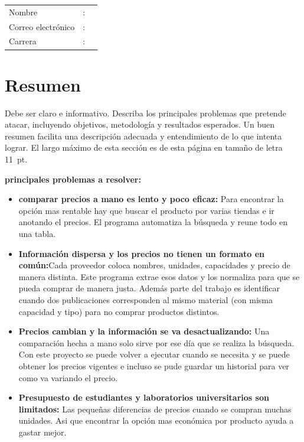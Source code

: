\documentclass[11pt,spanish]{article}
\begin{document}
\vspace{20mm}

\begin{tabular}{lcl}
  Nombre &:& \\
  Correo electrónico &:& \\
  Carrera &:& \\
\end{tabular}

\newpage
\section{Resumen}

\begin{framed}
  \noindent Debe ser claro e informativo. Describa los principales
  problemas que pretende atacar, incluyendo objetivos, metodología y
  resultados esperados. Un buen resumen facilita una descripción
  adecuada y entendimiento de lo que intenta lograr. El largo máximo
  de esta sección es de esta página en tamaño de letra 11~pt.
\end{framed}
\textbf{principales problemas a resolver:} 
\begin{itemize}
\item \textbf{comparar precios a mano es lento y poco eficaz:} Para encontrar la opción mas rentable hay que buscar el producto por varias tiendas e ir anotando el precios. El programa automatiza la búsqueda y reune todo en una tabla.
\item \textbf{Información dispersa y los precios no tienen un formato en común:}Cada proveedor coloca nombres, unidades, capacidades y precio de manera distinta. Este programa extrae esos datos y los normaliza para que se pueda comprar de manera justa. Además parte del trabajo es identificar cuando dos publicaciones corresponden al mismo material (con misma capacidad y tipo) para no comprar productos distintos.
\item \textbf{Precios cambian y la información se va desactualizando:} Una comparación hecha a mano solo sirve por ese día que se realiza la búsqueda. Con este proyecto se puede volver a ejecutar cuando se necesita y se puede obtener los precios vigentes e incluso se pude guardar un historial para ver como va variando el precio.
\item \textbf{Presupuesto de estudiantes y laboratorios universitarios son limitados:} Las pequeñas diferencias de precios cuando se compran muchas unidades. Asi que encontrar la opción mas económica por producto ayuda a gastar mejor.   
\end{itemize}
\end{document}
